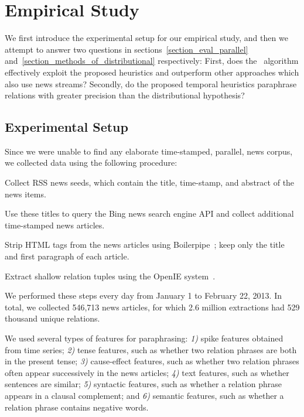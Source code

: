 \section{Empirical Study}
\label{empirical_study}
We first introduce the experimental setup for our empirical study, and then we
attempt to answer two questions in sections~\ref{section_eval_parallel}
and~\ref{section_methods_of_distributional} respectively: First, does the \sys\
algorithm effectively exploit the proposed heuristics and outperform other
approaches which also use news streams? Secondly, do the proposed temporal
heuristics paraphrase relations with greater precision than the distributional
hypothesis?


\subsection{Experimental Setup}
\label{section_data_generation}

Since we were unable to find any elaborate time-stamped, parallel, news
corpus, we collected data using the following procedure:

\bi

\item Collect RSS news seeds, which contain the title, time-stamp, and
abstract of the news items.

\item Use these titles to query the Bing news search engine API and collect
additional time-stamped news articles.

\item Strip HTML tags from the news articles using
Boilerpipe~\cite{kohlschutter2010boilerplate}; keep only the title and
first paragraph of each article.

\item Extract shallow relation tuples using the OpenIE
system~\cite{fader11}. 

\ei

We performed these steps every day from January 1 to February 22, 2013.  In
total, we collected 546,713 news articles, for which 2.6 million
extractions had 529 thousand unique relations. 

We used several types of features for paraphrasing:
\textit{1)} spike features obtained from time series;
\textit{2)} tense features, such as whether two relation phrases are both in the present tense;
\textit{3)} cause-effect features, such as whether two relation phrases often appear successively in the news articles;
\textit{4)} text features, such as whether sentences are similar;
\textit{5)} syntactic features, such as whether a relation phrase appears in a clausal complement; and
\textit{6)} semantic features, such as whether a relation phrase contains negative words.

